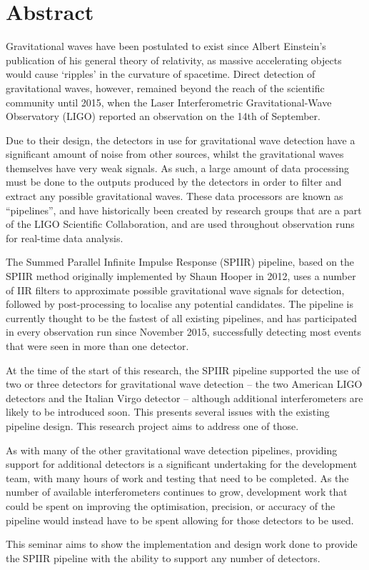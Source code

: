 \section{Abstract}
Gravitational waves have been postulated to exist since Albert Einstein’s publication of his general theory of relativity, as massive accelerating objects would cause ‘ripples’ in the curvature of spacetime.
Direct detection of gravitational waves, however, remained beyond the reach of the scientific community until 2015, when the Laser Interferometric Gravitational-Wave Observatory (LIGO) reported an observation on the 14th of September.

Due to their design, the detectors in use for gravitational wave detection have a significant amount of noise from other sources, whilst the gravitational waves themselves have very weak signals.
As such, a large amount of data processing must be done to the outputs produced by the detectors in order to filter and extract any possible gravitational waves.
These data processors are known as “pipelines”, and have historically been created by research groups that are a part of the LIGO Scientific Collaboration, and are used throughout observation runs for real-time data analysis.

The Summed Parallel Infinite Impulse Response (SPIIR) pipeline, based on the SPIIR method originally implemented by Shaun Hooper in 2012, uses a number of IIR filters to approximate possible gravitational wave signals for detection, followed by post-processing to localise any potential candidates.
The pipeline is currently thought to be the fastest of all existing pipelines, and has participated in every observation run since November 2015, successfully detecting most events that were seen in more than one detector.

At the time of the start of this research, the SPIIR pipeline supported the use of two or three detectors for gravitational wave detection – the two American LIGO detectors and the Italian Virgo detector – although additional interferometers are likely to be introduced soon.
This presents several issues with the existing pipeline design.
This research project aims to address one of those.

As with many of the other gravitational wave detection pipelines, providing support for additional detectors is a significant undertaking for the development team, with many hours of work and testing that need to be completed.
As the number of available interferometers continues to grow, development work that could be spent on improving the optimisation, precision, or accuracy of the pipeline would instead have to be spent allowing for those detectors to be used.

This seminar aims to show the implementation and design work done to provide the SPIIR pipeline with the ability to support any number of detectors.
